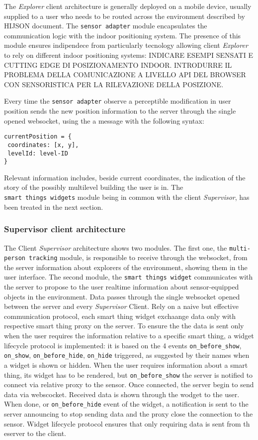 The \emph{Explorer} client architecture is generally deployed on a
mobile device, usually supplied to a user who needs to be routed across
the environment described by HIJSON document. The
\texttt{sensor\ adapter} module encapsulates the communication logic
with the indoor positioning system. The presence of this module ensures
indipendece from particularly tecnology allowing client \emph{Explorer}
to rely on different indoor positioning systems: INDICARE ESEMPI SENSATI
E CUTTING EDGE DI POSIZIONAMENTO INDOOR. INTRODURRE IL PROBLEMA DELLA
COMUNICAZIONE A LIVELLO API DEL BROWSER CON SENSORISTICA PER LA
RILEVAZIONE DELLA POSIZIONE.

Every time the \texttt{sensor\ adapter} observe a perceptible
modification in user position sends the new position information to the
server through the single opened websocket, using the a message with the
following syntax:

\begin{verbatim}
currentPosition = {
 coordinates: [x, y],
 levelId: level-ID 
}
\end{verbatim}

Relevant information includes, beside current coordinates, the
indication of the story of the possibly multilevel building the user is
in. The \texttt{smart\ things\ widgets} module being in common with the
client \emph{Supervisor}, has been treated in the next section.

\subsubsection{Supervisor client architecture}\label{supervisor-client-architecture}

The Client \emph{Supervisor} architecture shows two modules. The first
one, the \texttt{multi-person\ tracking} module, is responsible to
receive through the websocket, from the server information about
explorers of the environment, showing them in the user interface. The
second module, the \texttt{smart\ things\ widget} communicates with the
server to propose to the user realtime information about sensor-equipped
objects in the environment. Data passes through the single websocket
opened between the server and every \emph{Supervisor} Client. Rely on a
naive but effective communication protocol, each smart thing widget
exchaange data only with respective smart thing proxy on the server. To
ensure the the data is sent only when the user requires the information
relative to a specific smart thing, a widget lifecycle protocol is
implemented: it is based on the 4 events \texttt{on\_before\_show},
\texttt{on\_show}, \texttt{on\_before\_hide}, \texttt{on\_hide}
triggered, as suggested by their names when a widget is shown or hidden.
When the user requires information about a smart thing, its widget has
to be rendered, but \texttt{on\_before\_show} the server is notified to
connect via relative proxy to the sensor. Once connected, the server
begin to send data via webscocket. Received data is shown through the
wodget to the user. When done, or \texttt{on\_before\_hide} event of the
widget, a notification is sent to the server announcing to stop sending
data and the proxy close the connection to the sensor. Widget lifecycle
protocol ensures that only requiring data is sent from th eserver to the
client.
